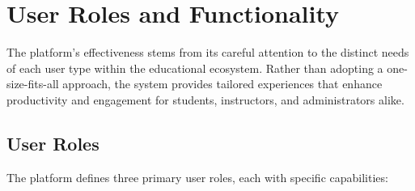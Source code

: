 \documentclass[12pt,a4paper]{article}
\begin{document}
\section{User Roles and Functionality}
\label{sec:user-roles-functionality}

The platform's effectiveness stems from its careful attention to the distinct needs of each user type within the educational ecosystem. Rather than adopting a one-size-fits-all approach, the system provides tailored experiences that enhance productivity and engagement for students, instructors, and administrators alike.

\subsection{User Roles}

The platform defines three primary user roles, each with specific capabilities:
\end{document}
